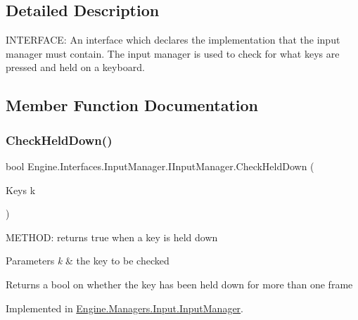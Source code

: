 \subsection{Detailed Description}
I\+N\+T\+E\+R\+F\+A\+CE\+: An interface which declares the implementation that the input manager must contain. The input manager is used to check for what keys are pressed and held on a keyboard. 



\subsection{Member Function Documentation}
\mbox{\label{a00450_a661496081120efdcd653693977f36fd9}} 
\subsubsection{\texorpdfstring{Check\+Held\+Down()}{CheckHeldDown()}}
{\footnotesize\ttfamily bool Engine.\+Interfaces.\+Input\+Manager.\+I\+Input\+Manager.\+Check\+Held\+Down (\begin{DoxyParamCaption}\item[{Keys}]{k }\end{DoxyParamCaption})}



M\+E\+T\+H\+OD\+: returns true when a key is held down 


\begin{DoxyParams}{Parameters}
{\em k} & the key to be checked\\
\hline
\end{DoxyParams}
\begin{DoxyReturn}{Returns}
a bool on whether the key has been held down for more than one frame
\end{DoxyReturn}


Implemented in \hyperlink{a00522_a40428e54a6265c8e18c51489321b1d4c}{Engine.\+Managers.\+Input.\+Input\+Manager}.

\mbox{\label{a00450_ab31bc2c7a5da56dc4a46ac378fde0590}} 
